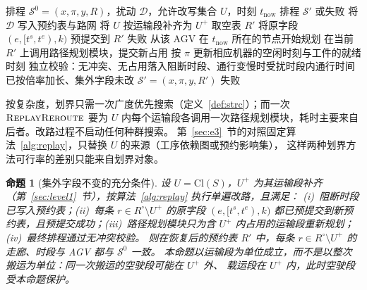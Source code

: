 \documentclass[manuscript,screen,review]{acmart}
\newtheorem{prop}{命题}
\begin{document}
\begin{algorithm}[t]
\caption{单遍改路 \(\textsc{ReplayReroute}\)}
\label{alg:replay}
\begin{algorithmic}[1]
\Require 排程 \(\mathcal{S}^0=(x,\pi,y,R)\)，扰动 \(\mathcal{D}\)，允许改写集合 \(U\)，时刻 \(t_{\mathrm{now}}\)
\Ensure 排程 \(\mathcal{S}'\) 或失败
\State 将 \(\mathcal{D}\) 写入预约表与路网
\State 将 \(U\) 按运输段补齐为 \(U^{+}\)
\State 取空表 \(R'\)
  \State 将原字段 \((e,[t^s,t^e),k)\) 预提交到 \(R'\)
    \State \Return 失败
  \EndIf
\EndFor
{}
  \State 从该 AGV 在 \(t_{\mathrm{now}}\) 所在的节点开始规划 
  \State 在当前 \(R'\) 上调用路径规划模块，提交新占用
  \State 按 \(\pi\) 更新相应机器的空闲时刻与工件的就绪时刻
\EndFor
\State 独立校验：无冲突、无占用落入阻断时段、通行变慢时受扰时段内通行时间已按倍率加长、集外字段未改
  \State \Return \(\mathcal{S}'=(x,\pi,y,R')\)
\Else
  \State \Return 失败
\EndIf
\end{algorithmic}
\end{algorithm}

按复杂度，划界只需一次广度优先搜索（定义~\ref{def:strc}）；而一次 \(\textsc{ReplayReroute}\)
要为 \(U\) 内每个运输段各调用一次路径规划模块，耗时主要来自后者。改路过程不启动任何种群搜索。
第~\ref{sec:e3}~节的对照固定算法~\ref{alg:replay}，只替换 \(U\) 的来源（工序依赖图或预约影响集），
这样两种划界方法可行率的差别只能来自划界对象。

\begin{prop}[集外字段不变的充分条件]
\label{prop:outside}
设 \(U=\mathrm{Cl}(S)\)，\(U^{+}\) 为其运输段补齐（第~\ref{sec:level1}~节），按算法~\ref{alg:replay} 执行单遍改路，且满足：
(i)~阻断时段已写入预约表；(ii)~每条 \(r\in R^{\circ}\setminus U^{+}\) 的原字段 \((e,[t^s,t^e),k)\)
都已预提交到新预约表，且预提交成功；(iii)~路径规划模块只为含 \(U^{+}\) 内占用的运输段重新规划；
(iv)~最终排程通过无冲突校验。
则在恢复后的预约表 \(R'\) 中，每条 \(r\in R^{\circ}\setminus U^{+}\) 的走廊、时段与 AGV 都与 \(\mathcal{S}^0\) 一致。
本命题以运输段为单位成立，而不是以整次搬运为单位：同一次搬运的空驶段可能在 \(U^{+}\) 外、
载运段在 \(U^{+}\) 内，此时空驶段受本命题保护。
\end{prop}
\end{document}
